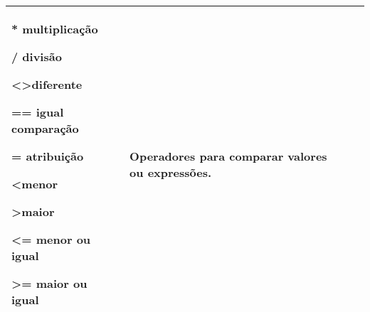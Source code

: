 \begin{landscape}
\begin{small}
\begin{longtable}{ p{3cm} p{3cm} p{8cm} p{8cm}}
    * multiplicação
    
    / divisão
    
    \textless\textgreater diferente
    
    == igual comparação
    
    = atribuição
    
    \textless menor
    
    \textgreater maior
    
    \textless= menor ou igual
    
    \textgreater= maior ou igual

    &  Operadores para comparar valores ou expressões.
    & 
\\ 
\bottomrule
\end{longtable}
\end{small}

\end{landscape}
